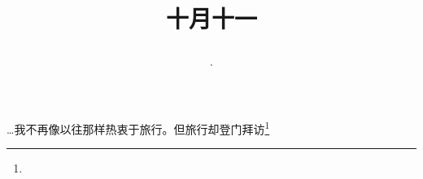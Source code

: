 \title{\date[d=11,m=11,y=2024][year:cn-y,年,month:cn,day:cn,日,·,weekday]·十月十一 }
…我不再像以往那样热衷于旅行。但旅行却登门拜访\footnote{ }

